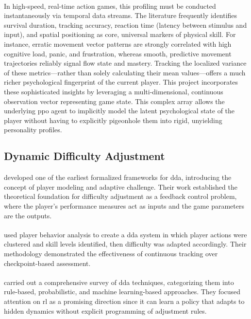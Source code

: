 \paragraph{} In high-speed, real-time action games, this profiling must be conducted instantaneously via temporal data streams. The literature frequently identifies survival duration, tracking accuracy, reaction time (latency between stimulus and input), and spatial positioning as core, universal markers of physical skill. For instance, erratic movement vector patterns are strongly correlated with high cognitive load, panic, and frustration, whereas smooth, predictive movement trajectories reliably signal flow state and mastery. Tracking the localized variance of these metrics---rather than solely calculating their mean values---offers a much richer psychological fingerprint of the current player. This project incorporates these sophisticated insights by leveraging a multi-dimensional, continuous observation vector representing game state. This complex array allows the underlying \ac{ppo} agent to implicitly model the latent psychological state of the player without having to explicitly pigeonhole them into rigid, unyielding personality profiles.

\subsection{Dynamic Difficulty Adjustment}
\paragraph{} \citet{hunicke2004ai} developed one of the earliest formalized frameworks for \ac{dda}, introducing the concept of player modeling and adaptive challenge. Their work established the theoretical foundation for difficulty adjustment as a feedback control problem, where the player's performance measures act as inputs and the game parameters are the outputs.

\paragraph{} \citet{andrade2006dynamic} used player behavior analysis to create a \ac{dda} system in which player actions were clustered and skill levels identified, then difficulty was adapted accordingly. Their methodology demonstrated the effectiveness of continuous tracking over checkpoint-based assessment.

\paragraph{} \citet{zohaib2018dynamic} carried out a comprehensive survey of \ac{dda} techniques, categorizing them into rule-based, probabilistic, and machine learning-based approaches. They focused attention on \ac{rl} as a promising direction since it can learn a policy that adapts to hidden dynamics without explicit programming of adjustment rules.

